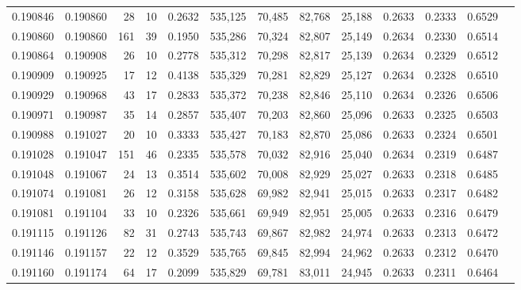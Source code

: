 \begin{tabular}{rrrrrrrrrrrrr}
0.190846 & 0.190860 &    28 &  10 &                                     0.2632 & 535,125 &  70,485 &  82,768 &  25,188 & 0.2633 & 0.2333 & 0.6529 \\
0.190860 & 0.190860 &   161 &  39 &                                     0.1950 & 535,286 &  70,324 &  82,807 &  25,149 & 0.2634 & 0.2330 & 0.6514 \\
0.190864 & 0.190908 &    26 &  10 &                                     0.2778 & 535,312 &  70,298 &  82,817 &  25,139 & 0.2634 & 0.2329 & 0.6512 \\
0.190909 & 0.190925 &    17 &  12 &                                     0.4138 & 535,329 &  70,281 &  82,829 &  25,127 & 0.2634 & 0.2328 & 0.6510 \\
0.190929 & 0.190968 &    43 &  17 &                                     0.2833 & 535,372 &  70,238 &  82,846 &  25,110 & 0.2634 & 0.2326 & 0.6506 \\
0.190971 & 0.190987 &    35 &  14 &                                     0.2857 & 535,407 &  70,203 &  82,860 &  25,096 & 0.2633 & 0.2325 & 0.6503 \\
0.190988 & 0.191027 &    20 &  10 &                                     0.3333 & 535,427 &  70,183 &  82,870 &  25,086 & 0.2633 & 0.2324 & 0.6501 \\
0.191028 & 0.191047 &   151 &  46 &                                     0.2335 & 535,578 &  70,032 &  82,916 &  25,040 & 0.2634 & 0.2319 & 0.6487 \\
0.191048 & 0.191067 &    24 &  13 &                                     0.3514 & 535,602 &  70,008 &  82,929 &  25,027 & 0.2633 & 0.2318 & 0.6485 \\
0.191074 & 0.191081 &    26 &  12 &                                     0.3158 & 535,628 &  69,982 &  82,941 &  25,015 & 0.2633 & 0.2317 & 0.6482 \\
0.191081 & 0.191104 &    33 &  10 &                                     0.2326 & 535,661 &  69,949 &  82,951 &  25,005 & 0.2633 & 0.2316 & 0.6479 \\
0.191115 & 0.191126 &    82 &  31 &                                     0.2743 & 535,743 &  69,867 &  82,982 &  24,974 & 0.2633 & 0.2313 & 0.6472 \\
0.191146 & 0.191157 &    22 &  12 &                                     0.3529 & 535,765 &  69,845 &  82,994 &  24,962 & 0.2633 & 0.2312 & 0.6470 \\
0.191160 & 0.191174 &    64 &  17 &                                     0.2099 & 535,829 &  69,781 &  83,011 &  24,945 & 0.2633 & 0.2311 & 0.6464 \\

\end{tabular}
